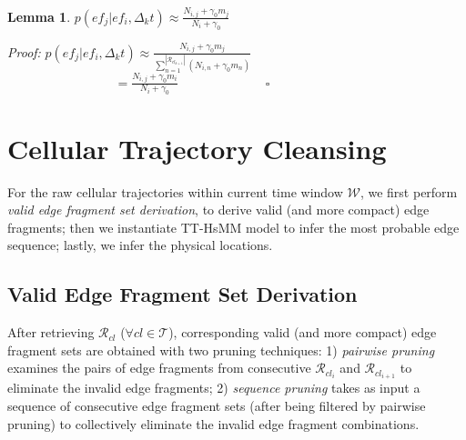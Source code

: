 \documentclass{vldb}
\newtheorem{lemma}{Lemma}
\begin{document}
	\begin{lemma}
		\label{le:p-atran}
		$p(ef_{j}|ef_i,\Delta_k t)\approx\frac{N_{i,j}+\gamma_0 m_j}{N_i+\gamma_0}$
	\end{lemma}
	
	\textit{Proof: } %
	$p(ef_{j}|ef_i,\Delta_k t)\approx\frac{N_{i,j}+\gamma_0 m_j}{\sum_{n=1}^{|\mathcal{R}_{cl_{k+1}}|} (N_{i,n}+\gamma_0 m_n)}$\\
	$~~~~~~~~~~~~~~~~~~~~~~~~~~~~~~~~~~~~~~=\frac{N_{i,j}+\gamma_0 m_i}{N_i+\gamma_0}~~~~~~~~~~~~~~~~~~~~~~~~~~~~~~~\square$
	
	
	\section{Cellular Trajectory Cleansing}
	\label{sec:cell-clean}
	
	For the raw cellular trajectories within current time window $\mathcal{W}$, 
	we first perform {\em valid edge fragment set derivation}, 
	to derive valid (and more compact) edge fragments;
	then we instantiate TT-HsMM model to infer the most probable edge sequence; %
	lastly, we infer the physical locations. %
		
	\subsection{Valid Edge Fragment Set Derivation}
	\label{sub-sec:break}
	
	After retrieving $\mathcal{R}_{cl}$ ($\forall cl\in\mathcal{T}$), corresponding valid (and more compact) edge fragment sets are obtained with two pruning techniques:
	1) {\em pairwise pruning} examines the pairs of edge fragments from consecutive $\mathcal{R}_{cl_i}$ and $\mathcal{R}_{cl_{i+1}}$ to eliminate the invalid edge fragments; 
	2) {\em sequence pruning} takes as input a sequence of consecutive edge fragment sets (after being filtered by pairwise pruning) to collectively eliminate the invalid edge fragment combinations. %
	
\end{document}
